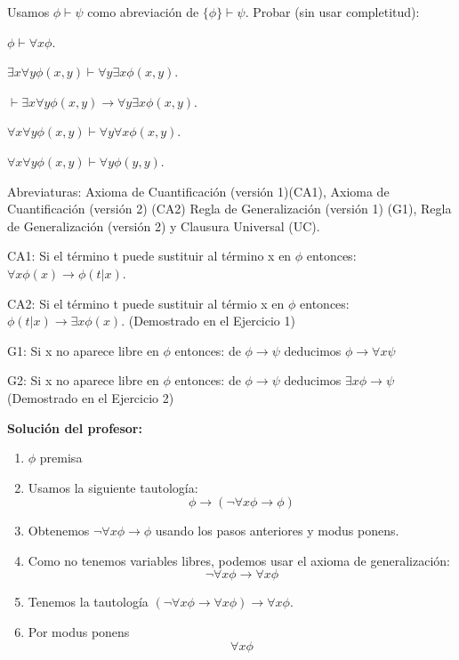 \begin{problem}   Usamos $\phi \vdash \psi$ como abreviaci\'on de  $\{\phi\} \vdash \psi$.  Probar (sin usar completitud):

\ppart $ \phi  \vdash   \forall x \phi$.

\ppart  $\exists x \forall y \phi (x,y)  \vdash   \forall y \exists x \phi (x,y)$.

\ppart  $ \vdash  \exists x \forall y \phi (x,y)  \to \forall y \exists x \phi (x,y)$.

\ppart   $  \forall x \forall y \phi (x,y) \vdash   \forall y \forall x \phi (x,y)$.

\ppart   $  \forall x \forall y \phi (x,y) \vdash   \forall y \phi (y,y)$.

\solution

Abreviaturas: Axioma de Cuantificación (versión 1)(CA1), Axioma de Cuantificación (versión 2) (CA2) Regla de Generalización (versión 1) (G1), Regla de Generalización (versión 2) y  Clausura Universal (UC).


CA1: Si el término t puede sustituir al término x en $\phi$ entonces: $\forall x \phi(x) \to \phi(t|x)$.

CA2: Si el término t puede sustituir al térmio x en $\phi$ entonces: $\phi(t|x) \to \exists x \phi(x)$. (Demostrado en el Ejercicio 1)

G1: Si x no aparece libre en $\phi$ entonces: de $\phi \to \psi$ deducimos $\phi \to \forall x \psi$

G2: Si x no aparece libre en $\phi$ entonces: de $\phi \to \psi$ deducimos $\exists x \phi \to \psi$ (Demostrado en el Ejercicio 2)


\spart

\textbf{Solución del profesor:}
\begin{enumerate}
	\item $\phi$ premisa
	\item Usamos la siguiente tautología:
	$$\phi\to(\neg \forall x \phi \to \phi)$$
	\item Obtenemos $\neg\forall x\phi\to \phi$ usando los pasos anteriores y modus ponens.
	\item Como no tenemos variables libres, podemos usar el axioma de generalización:
	$$\neg \forall x \phi \to \forall x \phi$$
	\item Tenemos la tautología $(\neg \forall x\phi \to \forall x\phi)\to \forall x\phi$.
	\item Por modus ponens
	$$\forall x \phi $$
\end{enumerate}


\end{problem}
